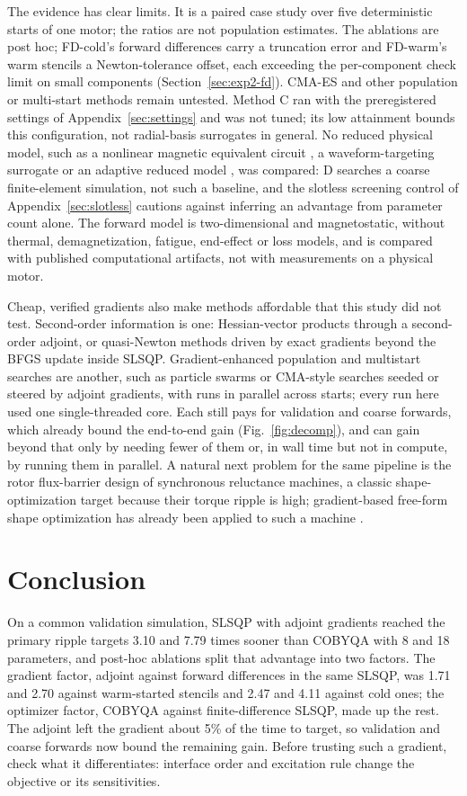 \documentclass{anvil-paper}
\begin{document}
The evidence has clear limits. It is a paired case study over five
deterministic starts of one motor; the ratios are not population estimates.
The ablations are post hoc; FD-cold's forward differences carry a truncation
error and FD-warm's warm stencils a Newton-tolerance offset, each exceeding the
per-component check limit on small components (Section~\ref{sec:exp2-fd}). CMA-ES and other population or
multi-start methods remain untested.
Method C ran with the preregistered settings of
Appendix~\ref{sec:settings} and was not tuned; its low attainment bounds
this configuration, not radial-basis surrogates in general. No reduced
physical model, such as a nonlinear magnetic equivalent circuit
\citep{kemmetmueller2015}, a waveform-targeting surrogate \citep{roomi2022}
or an adaptive reduced model \citep{wen2023}, was compared: D searches a coarse finite-element simulation, not such a baseline, and
the slotless screening control of Appendix~\ref{sec:slotless} cautions
against inferring an advantage from parameter count alone. The forward model is two-dimensional and
magnetostatic, without thermal, demagnetization, fatigue, end-effect or
loss models, and is compared with published computational artifacts, not
with measurements on a physical motor.

Cheap, verified gradients also make methods affordable that this study did
not test. Second-order information is one: Hessian-vector products through a
second-order adjoint, or quasi-Newton methods driven by exact gradients beyond
the BFGS update inside SLSQP. Gradient-enhanced population and multistart
searches are another, such as particle swarms or CMA-style searches seeded or
steered by adjoint gradients, with runs in parallel across starts; every run
here used one single-threaded core. Each still pays for validation and coarse
forwards, which already bound the end-to-end gain (Fig.~\ref{fig:decomp}), and
can gain beyond that only by needing fewer of them or, in wall time but not in
compute, by running them in parallel. A natural next problem for the same
pipeline is the rotor flux-barrier design of synchronous reluctance machines,
a classic shape-optimization target because their torque ripple is high;
gradient-based free-form shape optimization has already been applied to such a
machine \citep{gangl2022multi}.

\section{Conclusion}
On a common validation simulation, SLSQP with adjoint gradients reached the
primary ripple targets 3.10 and 7.79 times sooner than COBYQA with 8 and 18
parameters, and post-hoc ablations split that advantage into two factors.
The gradient factor, adjoint against forward differences in the same
SLSQP, was 1.71 and 2.70 against warm-started stencils and 2.47 and 4.11
against cold ones; the optimizer factor, COBYQA against finite-difference
SLSQP, made up the rest. The adjoint left the gradient about 5\% of the
time to target, so validation and coarse forwards now bound the
remaining gain. Before trusting such a gradient, check what it
differentiates: interface order and excitation rule change the objective
or its sensitivities.
\end{document}
